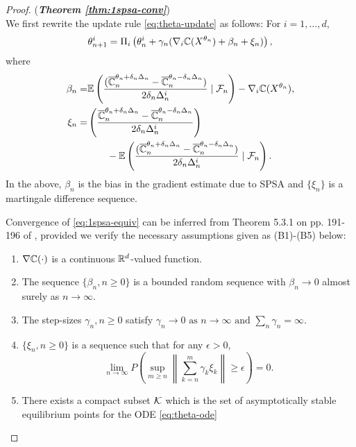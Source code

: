 \begin{proof}(\textbf{\textit{Theorem \ref{thm:1spsa-conv}}})\ \\
We first rewrite the update rule \eqref{eq:theta-update} as follows: For $i=1,\ldots,d$,
\begin{align}
\theta^{i}_{n+1}  =  \Pi_i\left(\theta^{i}_n +  \gamma_n(\nabla_{i} \mathbb{C}(X^{\theta_n}) + \beta_n + \xi_n)\right), 
\label{eq:1spsa-equiv}
\end{align}
where 
\begin{align*}
\beta_n = &\mathbb{E}\left(\dfrac{(\overline {\mathbb{C}}_n^{\theta_n + \delta_n \Delta_n} -\overline {\mathbb{C}}_n^{\theta_n - \delta_n \Delta_n})}{2 \delta_n \Delta_n^{i}} \mid \mathcal{F}_n \right) - \nabla_i \mathbb{C}(X^{\theta_n}),\\
\xi_n = & \left(\dfrac{\overline {\mathbb{C}}_n^{\theta_n + \delta_n \Delta_n} -\overline {\mathbb{C}}_n^{\theta_n - \delta_n \Delta_n}}{2 \delta_n\Delta_n^{i}}\right) \\
&\qquad - \mathbb{E}\left(\dfrac{(\overline {\mathbb{C}}_n^{\theta_n + \delta_n \Delta_n} -\overline {\mathbb{C}}_n^{\theta_n - \delta_n \Delta_n})}{2 \delta_n \Delta_n^{i}}\mid \mathcal{F}_n \right).
\end{align*}
In the above, $\beta_n$ is the bias in the gradient estimate due to SPSA and $\{\xi_n\}$ is a martingale difference sequence.

Convergence of \eqref{eq:1spsa-equiv} can be inferred from Theorem 5.3.1 on pp. 191-196 of \cite{kushner-clark}, provided we verify the necessary assumptions given as (B1)-(B5) below:
\begin{enumerate}[\bfseries (B1)]
\item $\nabla \mathbb{C}(\cdot)$ is a continuous $\mathbb{R}^{d}$-valued function.
\item  The sequence $\{\beta_n,n\geq 0\}$ is a bounded random sequence with
$\beta_n \rightarrow 0$ almost surely as $n\rightarrow \infty$.
\item The step-sizes $\gamma_n,n\geq 0$ satisfy
$  \gamma_n\rightarrow 0 \mbox{ as }n\rightarrow\infty \text{ and } \sum_n \gamma_n=\infty.$
\item $\{\xi_n, n\ge 0\}$ is a sequence such that for any $\epsilon>0$,
\[ \lim_{n\rightarrow\infty} P\left( \sup_{m\geq n}  \left\|
\sum_{k=n}^{m} \gamma_k \xi_k\right\| \geq \epsilon \right) = 0. \]
\item There exists a compact subset $\mathcal{K}$ which is the set of asymptotically stable equilibrium points for the  ODE \eqref{eq:theta-ode}
\end{enumerate} 


\end{proof}
